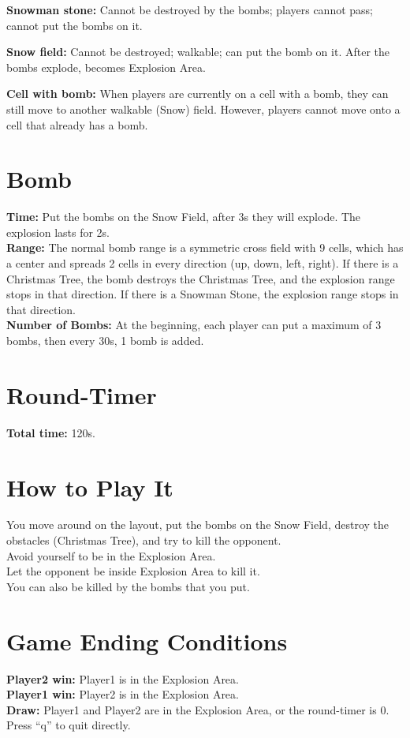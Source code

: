 \documentclass[12pt]{article}
\begin{document}
\indent \textbf{Snowman stone:} Cannot be destroyed by the bombs; players cannot pass; cannot put the bombs on it.

\indent \textbf{Snow field:} Cannot be destroyed; walkable; can put the bomb on it. After the bombs explode, becomes Explosion Area.

\indent \textbf{Cell with bomb:} When players are currently on a cell with a bomb, they can still move to another walkable (Snow) field. However, players cannot move onto a cell that already has a bomb.

\section*{Bomb}
\hspace{1.27cm}\textbf{Time:} Put the bombs on the Snow Field, after 3s they will explode. The explosion lasts for 2s. \\
\indent \textbf{Range:} The normal bomb range is a symmetric cross field with 9 cells, which has a center and spreads 2 cells in every direction (up, down, left, right). If there is a Christmas Tree, the bomb destroys the Christmas Tree, and the explosion range stops in that direction. If there is a Snowman Stone, the explosion range stops in that direction. \\
\indent \textbf{Number of Bombs:} At the beginning, each player can put a maximum of 3 bombs, then every 30s, 1 bomb is added.

\section*{Round-Timer}
\hspace{1.27cm}\textbf{Total time:} 120s.

\section*{How to Play It}
\hspace{1.27cm} You move around on the layout, put the bombs on the Snow Field, destroy the obstacles (Christmas Tree), and try to kill the opponent. \\
\indent Avoid yourself to be in the Explosion Area. \\
\indent Let the opponent be inside Explosion Area to kill it. \\
\indent You can also be killed by the bombs that you put.

\section*{Game Ending Conditions}
\hspace{1.27cm}\textbf{Player2 win:} Player1 is in the Explosion Area. \\
\indent \textbf{Player1 win:} Player2 is in the Explosion Area. \\
\indent \textbf{Draw:} Player1 and Player2 are in the Explosion Area, or the round-timer is 0. \\
\indent Press ``q'' to quit directly.
\end{document}
